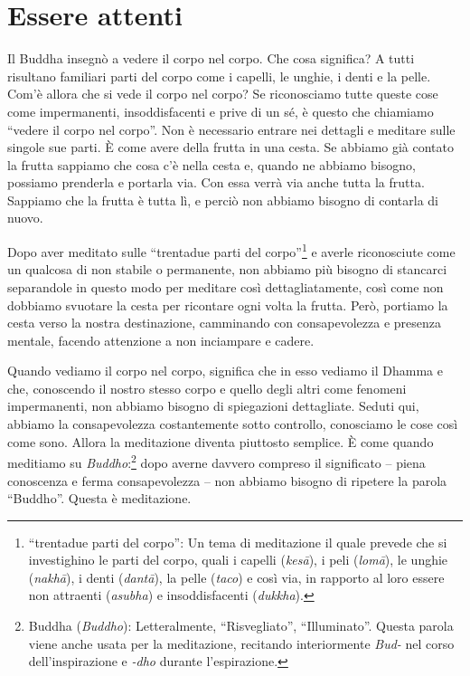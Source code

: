 \chapter{Essere attenti}

Il Buddha insegnò a vedere il corpo nel corpo. Che cosa significa? A
tutti risultano familiari parti del corpo come i capelli, le unghie, i
denti e la pelle. Com'è allora che si vede il corpo nel corpo? Se
riconosciamo tutte queste cose come impermanenti, insoddisfacenti e
prive di un sé, è questo che chiamiamo ``vedere il corpo nel corpo''.
Non è necessario entrare nei dettagli e meditare sulle singole sue
parti. È come avere della frutta in una cesta. Se abbiamo già contato la
frutta sappiamo che cosa c'è nella cesta e, quando ne abbiamo bisogno,
possiamo prenderla e portarla via. Con essa verrà via anche tutta la
frutta. Sappiamo che la frutta è tutta lì, e perciò non abbiamo bisogno
di contarla di nuovo.

Dopo aver meditato sulle ``trentadue parti del corpo''\footnote{%
  ``trentadue parti del corpo'': Un tema di meditazione il quale prevede che si
  investighino le parti del corpo, quali i capelli (\emph{kesā}), i peli
  (\emph{lomā}), le unghie (\emph{nakhā}), i denti (\emph{dantā}), la
  pelle (\emph{taco}) e così via, in rapporto al loro essere non
  attraenti (\emph{asubha}) e insoddisfacenti (\emph{dukkha}).}
e averle riconosciute come un qualcosa di non stabile o permanente, non abbiamo
più bisogno di stancarci separandole in questo modo per meditare così
dettagliatamente, così come non dobbiamo svuotare la cesta per ricontare
ogni volta la frutta. Però, portiamo la cesta verso la nostra
destinazione, camminando con consapevolezza e presenza mentale, facendo
attenzione a non inciampare e cadere.

Quando vediamo il corpo nel corpo, significa che in esso vediamo il
Dhamma e che, conoscendo il nostro stesso corpo e quello degli altri
come fenomeni impermanenti, non abbiamo bisogno di spiegazioni
dettagliate. Seduti qui, abbiamo la consapevolezza costantemente sotto
controllo, conosciamo le cose così come sono. Allora la meditazione
diventa piuttosto semplice. È come quando meditiamo su
\emph{Buddho}:\footnote{Buddha (\emph{Buddho}): Letteralmente,
  ``Risvegliato'', ``Illuminato''. Questa parola viene anche usata per
  la meditazione, recitando interiormente \emph{Bud-} nel corso
  dell'inspirazione e \emph{-dho} durante l'espirazione.} dopo averne
davvero compreso il significato -- piena conoscenza e ferma
consapevolezza -- non abbiamo bisogno di ripetere la parola ``Buddho''.
Questa è meditazione.

